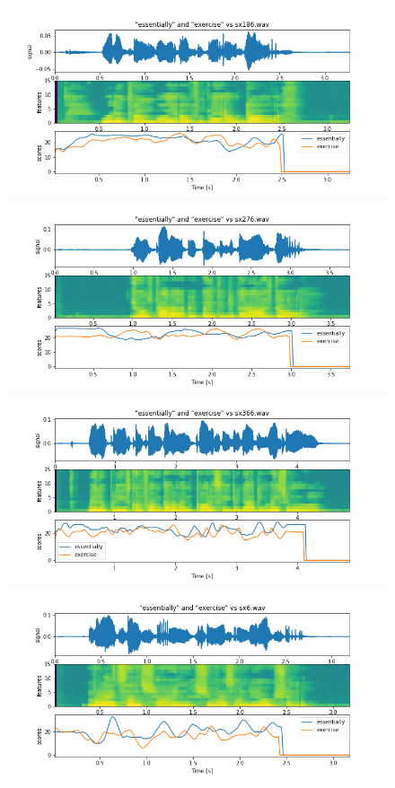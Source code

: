 \documentclass[11pt]{article}
\begin{document}
\begin{figure}[h]
	\includegraphics[width=\linewidth]{./docs/sx186.png}
	\includegraphics[width=\linewidth]{./docs/sx276.png}
	\includegraphics[width=\linewidth]{./docs/sx366.png}
	\includegraphics[width=\linewidth]{./docs/sx6.png}

\end{figure}
\end{document}
